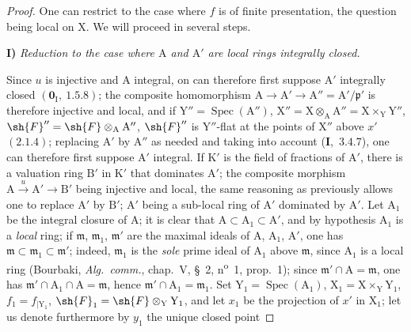 \begin{proof}
One can restrict to the case where $f$ is of finite presentation, the question being local
on $\mathrm{X}$. We will proceed in several steps.

\medskip
\noindent\textbf{I)} \emph{Reduction to the case where $\mathrm{A}$ and $\mathrm{A}'$ are local rings integrally closed.}

\medskip
Since $u$ is injective and $\mathrm{A}$ integral, on can therefore first suppose $\mathrm{A}'$
integrally closed $(\mathbf{0}_\mathrm{I},~1.5.8)$; the composite homomorphism $\mathrm{A}\to\mathrm{A}'\to\mathrm{A}''=\mathrm{A}'/\mathfrak{p}'$ is therefore injective
and local, and if $\mathrm{Y}''=\operatorname{Spec}(\mathrm{A}'')$, $\mathrm{X}''=\mathrm{X}\otimes_\mathrm{A}\mathrm{A}''=\mathrm{X}\times_\mathrm{Y}\mathrm{Y}''$, $\sh{F}''=\sh{F}\otimes_\mathrm{A}\mathrm{A}''$, $\sh{F}''$ is $\mathrm{Y}''$-flat
at the points of $\mathrm{X}''$ above $x'$ $(2.1.4)$; replacing $\mathrm{A}'$ by $\mathrm{A}''$ as needed and taking
into account (\textbf{I},~$3.4.7$), one can therefore first suppose $\mathrm{A}'$ integral. If $\mathrm{K}'$ is the field of
fractions of $\mathrm{A}'$, there is a valuation ring $\mathrm{B}'$ in $\mathrm{K}'$ that dominates $\mathrm{A}'$; the composite
morphism $\mathrm{A}\xrightarrow{u}\mathrm{A}'\to\mathrm{B}'$ being injective and local, the same reasoning as
previously allows one to replace $\mathrm{A}'$ by $\mathrm{B}'$; $\mathrm{A}'$ being a sub-local ring of $\mathrm{A}'$ dominated by $\mathrm{A}'$. Let $\mathrm{A}_1$ be the integral
closure of $\mathrm{A}$; it is clear that $\mathrm{A}\subset\mathrm{A}_1\subset\mathrm{A}'$, and by hypothesis $\mathrm{A}_1$ is a \emph{local} ring;
if $\mathfrak{m}$, $\mathfrak{m}_1$, $\mathfrak{m}'$ are the maximal ideals of $\mathrm{A}$, $\mathrm{A}_1$, $\mathrm{A}'$, one has $\mathfrak{m}\subset\mathfrak{m}_1\subset\mathfrak{m}'$; indeed, $\mathfrak{m}_1$ is
the \emph{sole} prime ideal of $\mathrm{A}_1$ above $\mathfrak{m}$, since $\mathrm{A}_1$ is a local ring (Bourbaki,
\emph{Alg.\ comm.}, chap.~V, \S~2, n\textsuperscript{o}~1, prop.~1); since $\mathfrak{m}'\cap\mathrm{A}=\mathfrak{m}$, one has $\mathfrak{m}'\cap\mathrm{A}_1\cap\mathrm{A}=\mathfrak{m}$,
hence $\mathfrak{m}'\cap\mathrm{A}_1=\mathfrak{m}_1$. Set $\mathrm{Y}_1=\operatorname{Spec}(\mathrm{A}_1)$, $\mathrm{X}_1=\mathrm{X}\times_\mathrm{Y}\mathrm{Y}_1$, $f_1=f_{|\mathrm{Y}_1}$, $\sh{F}_1=\sh{F}\otimes_\mathrm{Y}\mathrm{Y}_1$, and
let $x_1$ be the projection of $x'$ in $\mathrm{X}_1$; let us denote furthermore by $y_1$ the unique closed point

\end{proof}
